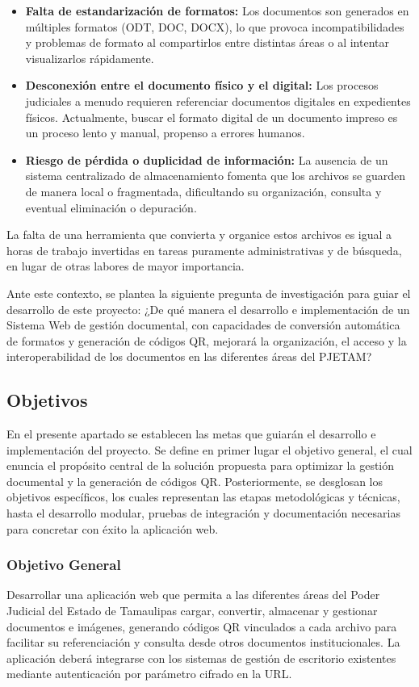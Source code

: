 \begin{itemize}
    \item \textbf{Falta de estandarización de formatos:} Los documentos son generados en múltiples formatos (ODT, DOC, DOCX), lo que provoca incompatibilidades y problemas de formato al compartirlos entre distintas áreas o al intentar visualizarlos rápidamente.
    \item \textbf{Desconexión entre el documento físico y el digital:} Los procesos judiciales a menudo requieren referenciar documentos digitales en expedientes físicos. Actualmente, buscar el formato digital de un documento impreso es un proceso lento y manual, propenso a errores humanos.
    \item \textbf{Riesgo de pérdida o duplicidad de información:} La ausencia de un sistema centralizado de almacenamiento fomenta que los archivos se guarden de manera local o fragmentada, dificultando su organización, consulta y eventual eliminación o depuración.
\end{itemize}

La falta de una herramienta que convierta y organice estos archivos es igual a horas de trabajo invertidas en tareas puramente administrativas y de búsqueda, en lugar de otras labores de mayor importancia.

Ante este contexto, se plantea la siguiente pregunta de investigación para guiar el desarrollo de este proyecto:
¿De qué manera el desarrollo e implementación de un Sistema Web de gestión documental, con capacidades de conversión automática de formatos y generación de códigos QR, mejorará la organización, el acceso y la interoperabilidad de los documentos en las diferentes áreas del PJETAM?

\subsection{Objetivos}
\label{sec:objetivos}
En el presente apartado se establecen las metas que guiarán el desarrollo e implementación del proyecto. Se define en primer lugar el objetivo general, el cual enuncia el propósito central de la solución propuesta para optimizar la gestión documental y la generación de códigos QR. Posteriormente, se desglosan los objetivos específicos, los cuales representan las etapas metodológicas y técnicas, hasta el desarrollo modular, pruebas de integración y documentación necesarias para concretar con éxito la aplicación web.

\subsubsection{Objetivo General}
\label{subsec:objetivo_general}
Desarrollar una aplicación web que permita a las diferentes áreas del Poder Judicial del Estado de Tamaulipas cargar, convertir, almacenar y gestionar documentos e imágenes, generando códigos QR vinculados a cada archivo para facilitar su referenciación y consulta desde otros documentos institucionales. La aplicación deberá integrarse con los sistemas de gestión de escritorio existentes mediante autenticación por parámetro cifrado en la URL.


